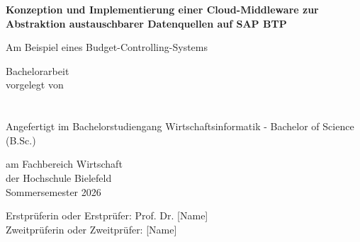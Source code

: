 \begin{titlepage}
    \centering
    \Large

    {\LARGE \textbf{Konzeption und Implementierung einer Cloud-Middleware zur Abstraktion austauschbarer Datenquellen auf SAP BTP}}

    \vspace*{0.5cm}
    {\large Am Beispiel eines Budget-Controlling-Systems}

    \vfill
    Bachelorarbeit \\
    vorgelegt von \\
    [Vorname Nachname] \\
    [Matrikelnummer] \\

    \vspace*{2cm}
    Angefertigt im Bachelorstudiengang Wirtschaftsinformatik - Bachelor of Science (B.Sc.)

    \vspace*{1cm}
    am Fachbereich Wirtschaft \\
    der Hochschule Bielefeld  \\
    Sommersemester 2026

    \vspace*{5cm}
    {\normalsize
    Erstprüferin oder Erstprüfer: \hspace{0.5cm} Prof. Dr. [Name] \\
    Zweitprüferin oder Zweitprüfer: \hspace{0.5cm} [Name] \\
    }

\end{titlepage}
